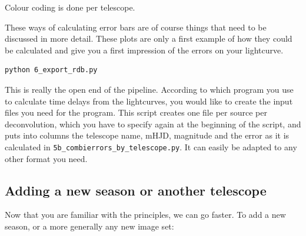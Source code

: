 Colour coding is done per telescope.

These ways of calculating error bars are of course things that need to be discussed in more detail. These plots are only a first example of how they could be calculated and give you a first impression of the errors on your lightcurve.

\begin{Verbatim}
python 6_export_rdb.py
\end{Verbatim}

This is really the open end of the pipeline. According to which program you use to calculate time delays from the lightcurves, you would like to create the input files you need for the program. This script creates one file per source per deconvolution, which you have to specify again at the beginning of the script, and puts into columns the telescope name, mHJD, magnitude and the error as it is calculated in \verb+5b_combierrors_by_telescope.py+. It can easily be adapted to any other format you need.

\subsection{Adding a new season or another telescope}

Now that you are familiar with the principles, we can go faster. To add a new season, or a more generally any new image set:

